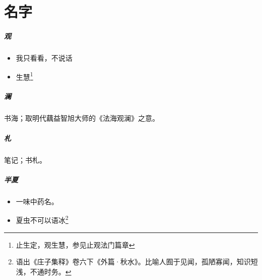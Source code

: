 \chapter{名字}

\paragraph{观}
\begin{itemize}
  \item 我只看看，不说话
  \item 生慧\footnote{止生定，观生慧，参见止观法门篇章}
\end{itemize}

\paragraph{澜}
书海；取明代藕益智旭大师的《法海观澜》之意。

\paragraph{札}
笔记；书札。

\paragraph{半夏}
\begin{itemize}
  \item 一味中药名\smiley。
  \item 夏虫不可以语冰\footnote{语出《庄子集释》卷六下《外篇·秋水》。比喻人囿于见闻，孤陋寡闻，知识短浅，不通时务。}
\end{itemize}
